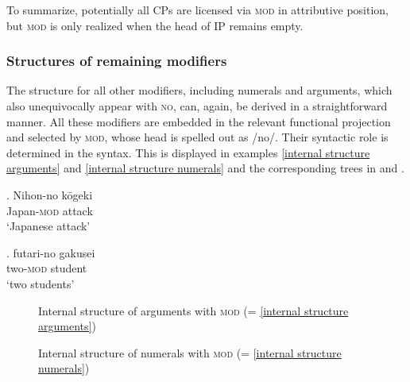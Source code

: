 To summarize, potentially all CPs are licensed via \textsc{mod} in attributive position, but \textsc{mod} is only realized when the head of IP remains empty.

\subsubsection{Structures of remaining modifiers} \label{other mod}

The structure for all other modifiers, including numerals and arguments, which also unequivocally appear with \textsc{no}, can, again, be derived in a straightforward manner. All these modifiers are embedded in the relevant functional projection and selected by \textsc{mod}, whose head is spelled out as /no/. Their syntactic role is determined in the syntax. This is displayed in examples \ref{internal structure arguments} and \ref{internal structure numerals} and the corresponding trees in  and .

\exg. Nihon-no kōgeki\\
Japan-\textsc{mod} attack\\
`Japanese attack’ \label{internal structure arguments}

\exg. futari-no gakusei\\
two-\textsc{mod} student\\
`two students’  \label{internal structure numerals}

\begin{figure}
\centering
{}
\caption{Internal structure of arguments with \textsc{mod} (= \ref{internal structure arguments})}
\label{Internal structure arguments tree}
\end{figure}

 \begin{figure}
\centering
{}
\caption{Internal structure of numerals with \textsc{mod} (= \ref{internal structure numerals})}
\label{Internal structure numerals tree}
\end{figure}

